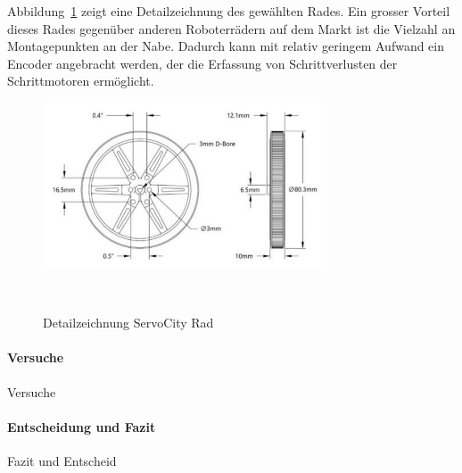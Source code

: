 \documentclass[main.tex]{subfiles} %
\begin{document}
Abbildung~\ref{fig:Rad_Vermassung} zeigt eine Detailzeichnung des gewählten Rades.
Ein grosser Vorteil dieses Rades gegenüber anderen Roboterrädern auf dem Markt ist
die Vielzahl an Montagepunkten an der Nabe. Dadurch kann mit relativ geringem Aufwand
ein Encoder angebracht werden, der die Erfassung von Schrittverlusten der
Schrittmotoren ermöglicht.

\begin{figure}[H]
    \centering
    \includegraphics[width=0.75\textwidth]{Rad_Vermassung.pdf}
    \caption{Detailzeichnung ServoCity Rad}~\label{fig:Rad_Vermassung}
\end{figure}


\paragraph{Versuche}
Versuche

\paragraph{Entscheidung und Fazit}
Fazit und Entscheid
\end{document}
